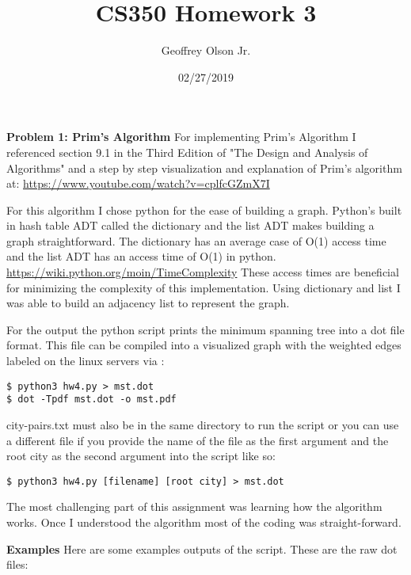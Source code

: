 \documentclass[12pt]{article}
\title{CS350 Homework 3}
\author{Geoffrey Olson Jr.}
\date{02/27/2019}
\begin{document}
\maketitle
\textbf{Problem 1: Prim's Algorithm}
For implementing Prim's Algorithm I referenced section 9.1 in the Third Edition of "The Design and Analysis of Algorithms" and a step by step visualization and explanation of Prim's algorithm  at:
\newline
\url{https://www.youtube.com/watch?v=cplfcGZmX7I}

For this algorithm I chose python for the ease of building a graph. Python's built in hash table ADT called the dictionary and the list ADT makes building a graph straightforward. The dictionary has an average case of O(1) access time and the list ADT has an access time of O(1) in python.
\url{https://wiki.python.org/moin/TimeComplexity}
These access times are beneficial for minimizing the complexity of this implementation. Using dictionary and list I was able to build an adjacency list to represent the graph.

For the output the python script prints the minimum spanning tree into a dot file format. This file can be compiled into a visualized graph with the weighted edges labeled on the linux servers via : 
\begin{lstlisting}
$ python3 hw4.py > mst.dot
$ dot -Tpdf mst.dot -o mst.pdf
\end{lstlisting}

city-pairs.txt must also be in the same directory to run the script or you can use a different file if you provide the name of the file as the first argument and the root city as the second argument into the script like so:
\begin{lstlisting}
$ python3 hw4.py [filename] [root city] > mst.dot
\end{lstlisting}

The most challenging part of this assignment was learning how the algorithm works. Once I understood the algorithm most of the coding was straight-forward.

\textbf{Examples}
Here are some examples outputs of the script. These are the raw dot files:
\end{document}
